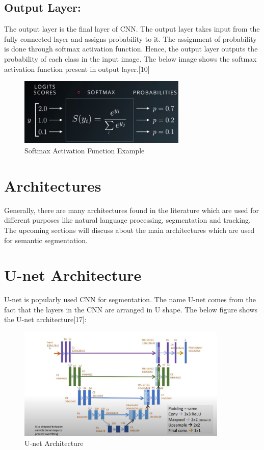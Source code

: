 \documentclass{IEEEtran}
\begin{document}
\subsection{\textbf{Output Layer:}}
The output layer is the final layer of CNN. The output layer takes input from the fully connected layer and assigns probability to it. The assignment of probability is done through softmax activation function. Hence, the output layer outputs the probability of each class in the input image. The below image shows the softmax activation function present in output layer.[10]

\begin{figure}[h]
    \centering
    \captionsetup{justification=centering}
    \includegraphics[width=8cm]{softmax}
    \caption{Softmax Activation Function Example}
    \label{fig:Softmax Activation Function Example}
\end{figure}

\section{Architectures}
Generally, there are many architectures found in the literature which are used for different purposes like natural language processing, segmentation and tracking. The upcoming sections will discuss about the main architectures which are used for semantic segmentation.
\newpage
\section{\textbf{U-net Architecture}}
U-net is popularly used CNN for segmentation. The name U-net comes from the fact that the layers in the CNN are arranged in U shape. The below figure shows the U-net architecture[17]:

\begin{figure}[h]
    \centering
    \captionsetup{justification=centering}
    \includegraphics[width=10cm]{u-net}
    \caption{U-net Architecture}
    \label{fig:U-net Architecture}
\end{figure}
\end{document}
